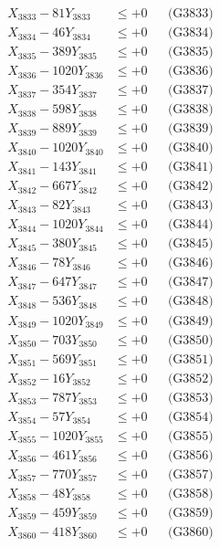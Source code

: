 \documentclass[a4paper,10pt]{article}
\begin{document}
{\begin{align}
X_{3833} - 81Y_{3833} &\leq +0 && \text{(G3833)} \\
X_{3834} - 46Y_{3834} &\leq +0 && \text{(G3834)} \\
X_{3835} - 389Y_{3835} &\leq +0 && \text{(G3835)} \\
X_{3836} - 1020Y_{3836} &\leq +0 && \text{(G3836)} \\
X_{3837} - 354Y_{3837} &\leq +0 && \text{(G3837)} \\
X_{3838} - 598Y_{3838} &\leq +0 && \text{(G3838)} \\
X_{3839} - 889Y_{3839} &\leq +0 && \text{(G3839)} \\
X_{3840} - 1020Y_{3840} &\leq +0 && \text{(G3840)} \\
\allowbreak
X_{3841} - 143Y_{3841} &\leq +0 && \text{(G3841)} \\
X_{3842} - 667Y_{3842} &\leq +0 && \text{(G3842)} \\
X_{3843} - 82Y_{3843} &\leq +0 && \text{(G3843)} \\
X_{3844} - 1020Y_{3844} &\leq +0 && \text{(G3844)} \\
X_{3845} - 380Y_{3845} &\leq +0 && \text{(G3845)} \\
X_{3846} - 78Y_{3846} &\leq +0 && \text{(G3846)} \\
X_{3847} - 647Y_{3847} &\leq +0 && \text{(G3847)} \\
X_{3848} - 536Y_{3848} &\leq +0 && \text{(G3848)} \\
X_{3849} - 1020Y_{3849} &\leq +0 && \text{(G3849)} \\
X_{3850} - 703Y_{3850} &\leq +0 && \text{(G3850)} \\
\allowbreak
X_{3851} - 569Y_{3851} &\leq +0 && \text{(G3851)} \\
X_{3852} - 16Y_{3852} &\leq +0 && \text{(G3852)} \\
X_{3853} - 787Y_{3853} &\leq +0 && \text{(G3853)} \\
X_{3854} - 57Y_{3854} &\leq +0 && \text{(G3854)} \\
X_{3855} - 1020Y_{3855} &\leq +0 && \text{(G3855)} \\
X_{3856} - 461Y_{3856} &\leq +0 && \text{(G3856)} \\
X_{3857} - 770Y_{3857} &\leq +0 && \text{(G3857)} \\
X_{3858} - 48Y_{3858} &\leq +0 && \text{(G3858)} \\
X_{3859} - 459Y_{3859} &\leq +0 && \text{(G3859)} \\
X_{3860} - 418Y_{3860} &\leq +0 && \text{(G3860)} \\

\end{align}}
\end{document}
